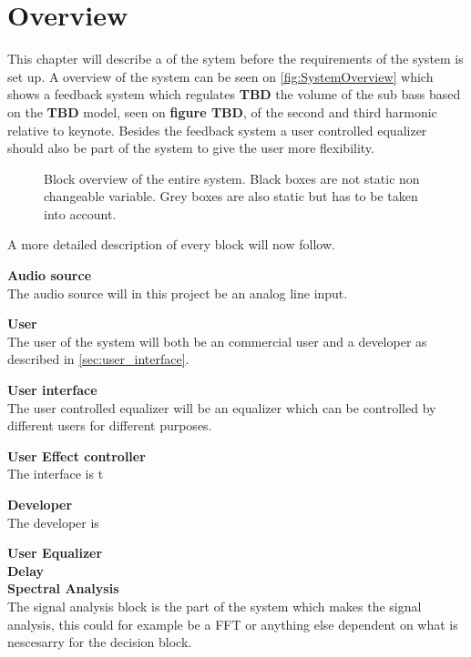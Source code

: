 \chapter{Overview} \label{ch:overview}
This chapter will describe a of the sytem before the requirements of the system is set up. A overview of the system can be seen on \autoref{fig:SystemOverview} which shows a feedback system which regulates \textbf{TBD} the volume of the sub bass based on the \textbf{TBD} model, seen on \textbf{figure TBD}, of the second and third harmonic relative to keynote. Besides the feedback system a user controlled equalizer should also be part of the system to give the user more flexibility.            

\begin{figure}[H]
\centering
{}
\scalebox{0.8}{
}
\caption{Block overview of the entire system. Black boxes are not static non changeable variable. Grey boxes are also static but has to be taken into account.}
\label{fig:SystemOverview}
\end{figure}
A more detailed description of every block will now follow.

\textbf{Audio source} \\
The audio source will in this project be an analog line input. 

\textbf{User} \\
The user of the system will both be an commercial user and a developer as described in \autoref{sec:user_interface}. 

\textbf{User interface}\\
The user controlled equalizer will be an equalizer which can be controlled by different users for different purposes.

\textbf{User Effect controller} \\
The interface is t 

\textbf{Developer} \\
The developer is

\textbf{User Equalizer} \\

\textbf{Delay} \\

\textbf{Spectral Analysis} \\
The signal analysis block is the part of the system which makes the signal analysis, this could for example be a FFT or anything else dependent on what is nescesarry for the decision block.

